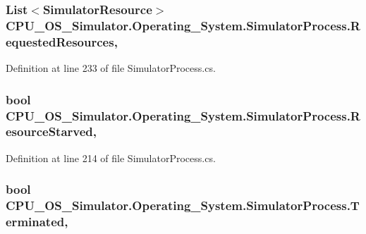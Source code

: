 \subsubsection[{Requested\+Resources}]{\setlength{\rightskip}{0pt plus 5cm}List$<${\bf Simulator\+Resource}$>$ C\+P\+U\+\_\+\+O\+S\+\_\+\+Simulator.\+Operating\+\_\+\+System.\+Simulator\+Process.\+Requested\+Resources\hspace{0.3cm}{\ttfamily [get]}, {\ttfamily [set]}}\label{class_c_p_u___o_s___simulator_1_1_operating___system_1_1_simulator_process_a116d320293064d278affda3fe9292d68}


Definition at line 233 of file Simulator\+Process.\+cs.

\hypertarget{class_c_p_u___o_s___simulator_1_1_operating___system_1_1_simulator_process_a6475f63c13feaefb3a5fbfc349ad4f2f}{}
\subsubsection[{Resource\+Starved}]{\setlength{\rightskip}{0pt plus 5cm}bool C\+P\+U\+\_\+\+O\+S\+\_\+\+Simulator.\+Operating\+\_\+\+System.\+Simulator\+Process.\+Resource\+Starved\hspace{0.3cm}{\ttfamily [get]}, {\ttfamily [set]}}\label{class_c_p_u___o_s___simulator_1_1_operating___system_1_1_simulator_process_a6475f63c13feaefb3a5fbfc349ad4f2f}


Definition at line 214 of file Simulator\+Process.\+cs.

\hypertarget{class_c_p_u___o_s___simulator_1_1_operating___system_1_1_simulator_process_a46466d1ba03a308d1aede92e004f8926}{}
\subsubsection[{Terminated}]{\setlength{\rightskip}{0pt plus 5cm}bool C\+P\+U\+\_\+\+O\+S\+\_\+\+Simulator.\+Operating\+\_\+\+System.\+Simulator\+Process.\+Terminated\hspace{0.3cm}{\ttfamily [get]}, {\ttfamily [set]}}\label{class_c_p_u___o_s___simulator_1_1_operating___system_1_1_simulator_process_a46466d1ba03a308d1aede92e004f8926}


